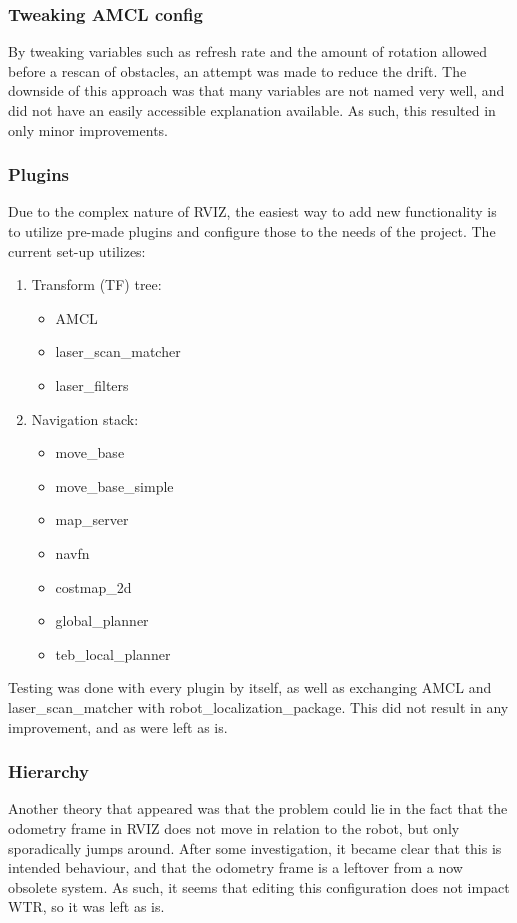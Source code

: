\subsubsection{Tweaking AMCL config}
\label{subs::AMCL}
By tweaking variables such as refresh rate and the amount of rotation allowed before a rescan of obstacles, an attempt was made to reduce the drift.
The downside of this approach was that many variables are not named very well, and did not have an easily accessible explanation available.
As such, this resulted in only minor improvements.

\subsubsection{Plugins} 
\label{subs::plugins}
Due to the complex nature of RVIZ, the easiest way to add new functionality is to utilize pre-made plugins and configure those to the needs of the project.
The current set-up utilizes:
\begin{enumerate}
\item Transform (TF) tree:
    \begin{itemize}
    \item AMCL
    \item laser\_scan\_matcher
    \item laser\_filters
\end{itemize}
\item Navigation stack:
\begin{itemize}
\item move\_base
\item move\_base\_simple
\item map\_server
\item navfn
\item costmap\_2d
\item global\_planner
\item teb\_local\_planner
\end{itemize}
\end{enumerate}
Testing was done with every plugin by itself, as well as exchanging AMCL and laser\_scan\_matcher with robot\_localization\_package.
This did not result in any improvement, and as were left as is.

\subsubsection{Hierarchy}
\label{subs::hier}
Another theory that appeared was that the problem could lie in the fact that the odometry frame in RVIZ does not move in relation to the robot, but only sporadically jumps around.
After some investigation, it became clear that this is intended behaviour, and that the odometry frame is a leftover from a now obsolete system.
As such, it seems that editing this configuration does not impact WTR, so it was left as is.

